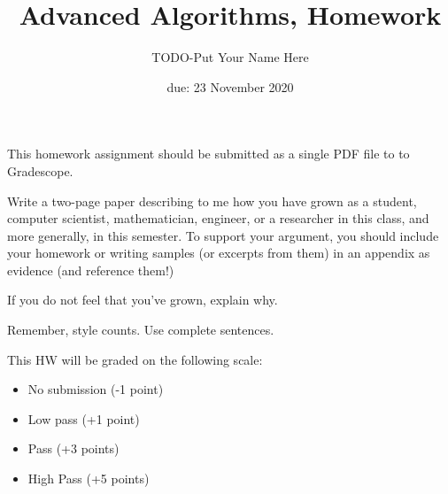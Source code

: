 \documentclass{article}
\title{Advanced Algorithms, Homework \hwnum}
\author{TODO-Put Your Name Here}
\date{due: 23 November 2020}
\begin{document}
\maketitle

This homework assignment should be
submitted as a single PDF file to to Gradescope.

Write a two-page paper describing to me how you have grown as a student,
computer scientist, mathematician, engineer, or a researcher in this class, and
more generally, in this semester.  To support your argument, you should include
your homework or writing samples (or excerpts from them) in an appendix as
evidence (and reference them!)

If you do not feel that you've grown, explain why.

Remember, style counts. Use complete sentences.

This HW will be graded on the following scale:
\begin{itemize}
    \item No submission (-1 point)
    \item Low pass (+1 point)
    \item Pass (+3 points)
    \item High Pass (+5 points)
\end{itemize}
\end{document}
